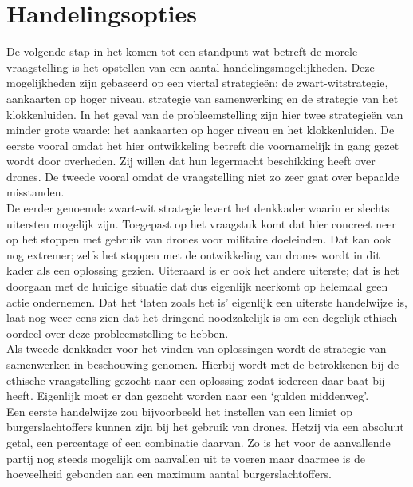 \section{Handelingsopties}
\subtitle{Job van Staveren}
De volgende stap in het komen tot een standpunt wat betreft de morele vraagstelling is het opstellen van een aantal handelingsmogelijkheden. Deze mogelijkheden zijn gebaseerd op een viertal strategie\"en: de zwart-witstrategie, aankaarten op hoger niveau, strategie van samenwerking en de strategie van het klokkenluiden.
In het geval van de probleemstelling zijn hier twee strategie\"en van minder grote waarde: het aankaarten op hoger niveau en het klokkenluiden. De eerste vooral omdat het hier ontwikkeling betreft die voornamelijk in gang gezet wordt door overheden. Zij willen dat hun legermacht beschikking heeft over drones. De tweede vooral omdat de vraagstelling niet zo zeer gaat over bepaalde misstanden.\\

De eerder genoemde zwart-wit strategie levert het denkkader waarin er slechts uitersten mogelijk zijn. Toegepast op het vraagstuk komt dat hier concreet neer op het stoppen met gebruik van drones voor militaire doeleinden. Dat kan ook nog extremer; zelfs het stoppen met de ontwikkeling van drones wordt in dit kader als een oplossing gezien. Uiteraard is er ook het andere uiterste; dat is het doorgaan met de huidige situatie dat dus eigenlijk neerkomt op helemaal geen actie ondernemen. Dat het `laten zoals het is' eigenlijk een uiterste handelwijze is, laat nog weer eens zien dat het dringend noodzakelijk is om een degelijk ethisch oordeel over deze probleemstelling te hebben.\\

Als tweede denkkader voor het vinden van oplossingen wordt de strategie van samenwerken in beschouwing genomen. Hierbij wordt met de betrokkenen bij de ethische vraagstelling gezocht naar een oplossing zodat iedereen daar baat bij heeft. Eigenlijk moet er dan gezocht worden naar een `gulden middenweg'.\\ 

Een eerste handelwijze zou bijvoorbeeld het instellen van een limiet op burgerslachtoffers kunnen zijn bij het gebruik van drones. Hetzij via een absoluut getal, een percentage of een combinatie daarvan. Zo is het voor de aanvallende partij nog steeds mogelijk om aanvallen uit te voeren maar daarmee is de hoeveelheid gebonden aan een maximum aantal burgerslachtoffers.\\

